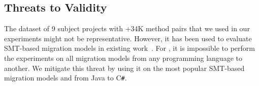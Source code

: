 \subsection{Threats to Validity}

The dataset of 9 subject projects with +34K method pairs that we used
in our experiments might not be representative. However, it has been
used to evaluate SMT-based migration models in existing
work~\cite{fse13,ase15,icsme16}. For {\model}, it is impossible to
perform the experiments on all migration models from any programming
language to another. We mitigate this threat by using it
on the most popular SMT-based migration models and from Java to
C\texttt{\#}. 

